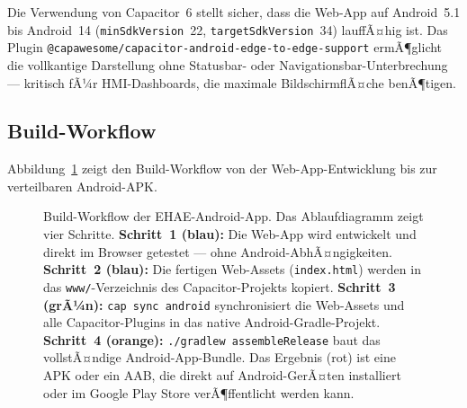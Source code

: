 ﻿\documentclass[12pt,a4paper]{article}
\begin{document}
Die Verwendung von Capacitor~6 stellt sicher, dass die Web-App auf Android~5.1 bis
Android~14 (\texttt{minSdkVersion}~22, \texttt{targetSdkVersion}~34) lauffÃ¤hig ist.
Das Plugin \texttt{@capawesome/\newline capacitor-android-edge-to-edge-support} ermÃ¶glicht die
vollkantige Darstellung ohne Statusbar- oder Navigationsbar-Unterbrechung --- kritisch
fÃ¼r HMI-Dashboards, die maximale BildschirmflÃ¤che benÃ¶tigen.

\subsection{Build-Workflow}

Abbildung~\ref{fig:capacitor_build} zeigt den Build-Workflow von der Web-App-Entwicklung
bis zur verteilbaren Android-APK.

\begin{figure}[h]
\centering
{}
\caption{Build-Workflow der EHAE-Android-App. Das Ablaufdiagramm zeigt vier Schritte.
  \textbf{Schritt~1 (blau):} Die Web-App wird entwickelt und direkt im Browser
  getestet --- ohne Android-AbhÃ¤ngigkeiten. \textbf{Schritt~2 (blau):} Die fertigen
  Web-Assets (\texttt{index.html}) werden in das \texttt{www/}-Verzeichnis des
  Capacitor-Projekts kopiert. \textbf{Schritt~3 (grÃ¼n):} \texttt{cap sync android}
  synchronisiert die Web-Assets und alle Capacitor-Plugins in das native
  Android-Gradle-Projekt. \textbf{Schritt~4 (orange):} \texttt{./gradlew
  assembleRelease} baut das vollstÃ¤ndige Android-App-Bundle. Das Ergebnis (rot) ist
  eine APK oder ein AAB, die direkt auf Android-GerÃ¤ten installiert oder im
  Google Play Store verÃ¶ffentlicht werden kann.}
\label{fig:capacitor_build}
\end{figure}
\end{document}
